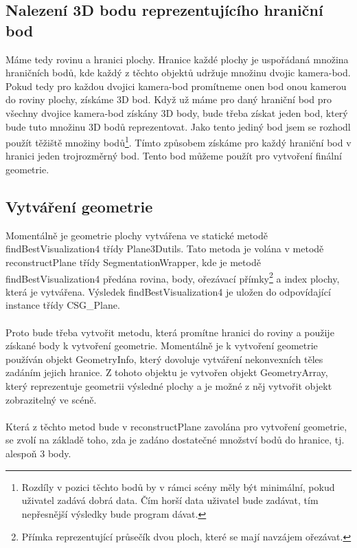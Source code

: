\documentclass[11pt,twoside,a4paper]{book}
\begin{document}
\subsection{Nalezení 3D bodu reprezentujícího hraniční bod}
\label{hraniceJedenBod}
Máme tedy rovinu a hranici plochy. Hranice každé plochy je uspořádaná množina hraničních bodů, kde každý z těchto objektů udržuje množinu dvojic kamera-bod. Pokud tedy pro každou dvojici kamera-bod promítneme onen bod onou kamerou do roviny plochy, získáme 3D bod. Když už máme pro daný hraniční bod pro všechny dvojice kamera-bod získány 3D body, bude třeba získat jeden bod, který bude tuto množinu 3D bodů reprezentovat. Jako tento jediný bod jsem se rozhodl použít těžiště množiny bodů\footnote{Rozdíly v pozici těchto bodů by v rámci scény měly být minimální, pokud uživatel zadává dobrá data. Čím horší data uživatel bude zadávat, tím nepřesnější výsledky bude program dávat.}. Tímto způsobem získáme pro každý hraniční bod v hranici jeden trojrozměrný bod. Tento bod můžeme použít pro vytvoření finální geometrie. 

\subsection{Vytváření geometrie}
\label{volbaMetody}
Momentálně je geometrie plochy vytvářena ve statické metodě findBestVisualization4 třídy Plane3Dutils. Tato metoda je volána v metodě reconstructPlane třídy SegmentationWrapper, kde je metodě findBestVisualization4 předána rovina, body, ořezávací přímky\footnote{Přímka reprezentující průsečík dvou ploch, které se mají navzájem ořezávat.} a index plochy, která je vytvářena. Výsledek findBestVisualization4 je uložen do odpovídající instance třídy CSG\_Plane. 
\paragraph{}
Proto bude třeba vytvořit metodu, která promítne hranici do roviny a použije získané body k vytvoření geometrie. Momentálně je k vytvoření geometrie používán objekt GeometryInfo, který dovoluje vytváření nekonvexních těles zadáním jejich hranice. Z tohoto objektu je vytvořen objekt GeometryArray, který reprezentuje geometrii výsledné plochy a je možné z něj vytvořit objekt zobrazitelný ve scéně.
\paragraph{}
Která z těchto metod bude v reconstructPlane zavolána pro vytvoření geometrie, se zvolí na základě toho, zda je zadáno dostatečné množství bodů do hranice, tj. alespoň $3$ body. 
\end{document}
